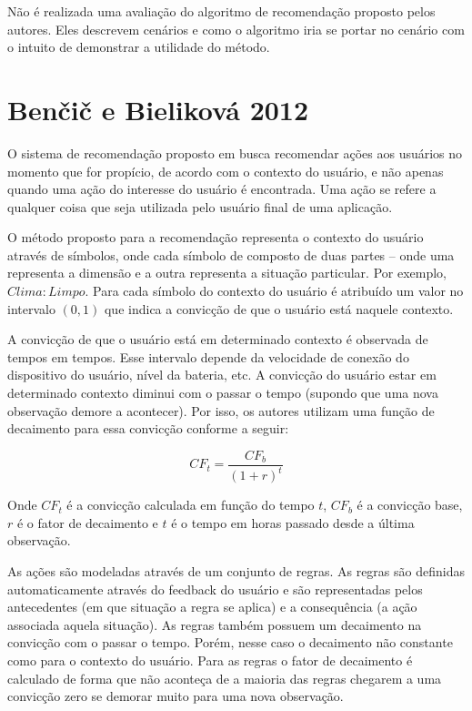 Não é realizada uma avaliação do algoritmo de recomendação proposto pelos autores. Eles descrevem cenários e como o
algoritmo iria se portar no cenário com o intuito de demonstrar a utilidade do método.

\section{Benčič e Bieliková 2012}

O sistema de recomendação proposto em  busca recomendar ações aos usuários no momento que
for propício, de acordo com o contexto do usuário, e não apenas quando uma ação do interesse do usuário é encontrada.
Uma ação se refere a qualquer coisa que seja utilizada pelo usuário final de uma aplicação.

O método proposto para a recomendação representa o contexto do usuário através de símbolos, onde cada símbolo de
composto de duas partes – onde uma representa a dimensão e a outra representa a situação particular. Por exemplo,
$Clima:Limpo$. Para cada símbolo do contexto do usuário é atribuído um valor no intervalo $(0, 1)$ que indica a convicção
de que o usuário está naquele contexto.

A convicção de que o usuário está em determinado contexto é observada de tempos em tempos. Esse intervalo depende da
velocidade de conexão do dispositivo do usuário, nível da bateria, etc. A convicção do usuário estar em determinado
contexto diminui com o passar o tempo (supondo que uma nova observação demore a acontecer). Por isso, os autores
utilizam uma função de decaimento para essa convicção conforme a seguir:

\begin{equation}
  CF_t = \frac{CF_b}{(1+r)^t}
  \label{eq:bencic-conviccao}
\end{equation}

Onde $CF_t$ é a convicção calculada em função do tempo $t$, $CF_b$ é a convicção base, $r$ é o fator de decaimento e $t$
é o tempo em horas passado desde a última observação.

As ações são modeladas através de um conjunto de regras. As regras são definidas automaticamente através do feedback do
usuário e são representadas pelos antecedentes (em que situação a regra se aplica) e a consequência (a ação associada
aquela situação). As regras também possuem um decaimento na convicção com o passar o tempo. Porém, nesse caso o
decaimento não constante como para o contexto do usuário. Para as regras o fator de decaimento é calculado de forma
que não aconteça de a maioria das regras chegarem a uma convicção zero se demorar muito para uma nova observação.

